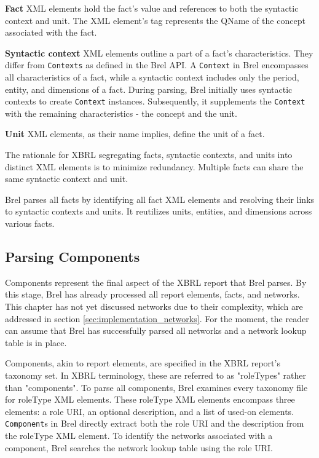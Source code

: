 \textbf{Fact} XML elements hold the fact's value and references to both the syntactic context and unit.
The XML element's tag represents the QName of the concept associated with the fact.

\textbf{Syntactic context} XML elements outline a part of a fact's characteristics.
They differ from \texttt{Contexts} as defined in the Brel API.
A \texttt{Context} in Brel encompasses all characteristics of a fact, while a syntactic context includes only the period, entity, and dimensions of a fact.
During parsing, Brel initially uses syntactic contexts to create \texttt{Context} instances.
Subsequently, it supplements the \texttt{Context} with the remaining characteristics - the concept and the unit.

\textbf{Unit} XML elements, as their name implies, define the unit of a fact.

The rationale for XBRL segregating facts, syntactic contexts, and units into distinct XML elements is to minimize redundancy.
Multiple facts can share the same syntactic context and unit.

Brel parses all facts by identifying all fact XML elements and resolving their links to syntactic contexts and units.
It reutilizes units, entities, and dimensions across various facts.

\subsection{Parsing Components}
\label{sec:implementation_components}

Components represent the final aspect of the XBRL report that Brel parses.
By this stage, Brel has already processed all report elements, facts, and networks.
This chapter has not yet discussed networks due to their complexity, which are addressed in section \ref{sec:implementation_networks}.
For the moment, the reader can assume that Brel has successfully parsed all networks and a network lookup table is in place.

Components, akin to report elements, are specified in the XBRL report's taxonomy set.
In XBRL terminology, these are referred to as "roleTypes" rather than "components".
To parse all components, Brel examines every taxonomy file for roleType XML elements.
These roleType XML elements encompass three elements: a role URI, an optional description, and a list of used-on elements.
\texttt{Component}s in Brel directly extract both the role URI and the description from the roleType XML element.
To identify the networks associated with a component, Brel searches the network lookup table using the role URI.

